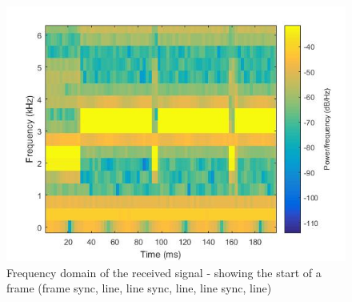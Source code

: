 \begin{figure}
	\centering
	\includegraphics[width=1.0\linewidth]{gfx/sstv_rxside.jpg}
	\caption{Frequency domain of the received signal - showing the start of a frame (frame sync, line, line sync, line, line sync, line)}
	\label{fig:impl:sstv:spectro_rx}
\end{figure}

